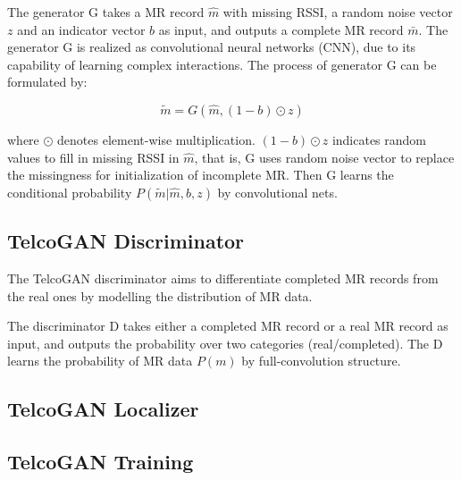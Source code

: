 The generator G takes a MR record $\hat{m}$ with missing RSSI, a random noise vector $z$ and an indicator vector $b$ as input, and outputs a complete MR record $\bar{m}$. The generator G is realized as convolutional neural networks (CNN), due to its capability of learning complex interactions. The process of generator G can be formulated by:

\begin{equation}\label{eq:gen}
  \tilde{m} = G(\hat{m}, (1-b)\odot z)
\end{equation}

where $\odot$ denotes element-wise multiplication. $(1-b)\odot z$ indicates random values to fill in missing RSSI in $\hat{m}$, that is, G uses random noise vector to replace the missingness for initialization of incomplete MR. Then G learns the conditional probability $P(\tilde{m}|\hat{m}, b, z)$ by convolutional nets.

\subsection{TelcoGAN Discriminator}
The TelcoGAN discriminator aims to differentiate completed MR records from the real ones by modelling the distribution of MR data.

The discriminator D takes either a completed MR record or a real MR record as input, and outputs the probability over two categories (real/completed). The D learns the probability of MR data $P(m)$ by full-convolution structure.

\subsection{TelcoGAN Localizer}


\subsection{TelcoGAN Training}
